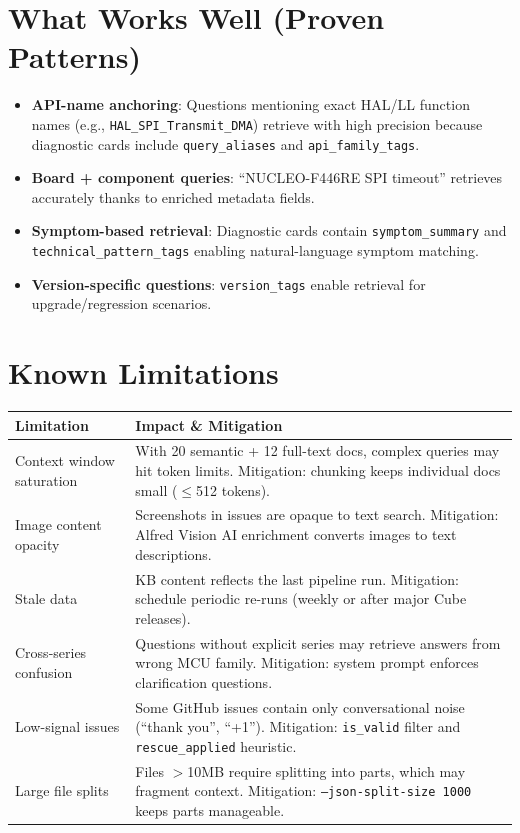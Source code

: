 \documentclass[12pt,a4paper]{report}
\begin{document}
\section{What Works Well (Proven Patterns)}

\begin{itemize}
  \item \textbf{API-name anchoring}: Questions mentioning exact HAL/LL function names (e.g., \texttt{HAL\_SPI\_Transmit\_DMA}) retrieve with high precision because diagnostic cards include \texttt{query\_aliases} and \texttt{api\_family\_tags}.
  \item \textbf{Board + component queries}: ``NUCLEO-F446RE SPI timeout'' retrieves accurately thanks to enriched metadata fields.
  \item \textbf{Symptom-based retrieval}: Diagnostic cards contain \texttt{symptom\_summary} and \texttt{technical\_pattern\_tags} enabling natural-language symptom matching.
  \item \textbf{Version-specific questions}: \texttt{version\_tags} enable retrieval for upgrade/regression scenarios.
\end{itemize}

\section{Known Limitations}

\begin{longtable}{p{5cm}p{8cm}}
\toprule
\textbf{Limitation} & \textbf{Impact \& Mitigation} \\
\midrule
Context window saturation & With 20 semantic + 12 full-text docs, complex queries may hit token limits. Mitigation: chunking keeps individual docs small ($\leq$512 tokens). \\
Image content opacity & Screenshots in issues are opaque to text search. Mitigation: Alfred Vision AI enrichment converts images to text descriptions. \\
Stale data & KB content reflects the last pipeline run. Mitigation: schedule periodic re-runs (weekly or after major Cube releases). \\
Cross-series confusion & Questions without explicit series may retrieve answers from wrong MCU family. Mitigation: system prompt enforces clarification questions. \\
Low-signal issues & Some GitHub issues contain only conversational noise (``thank you'', ``+1''). Mitigation: \texttt{is\_valid} filter and \texttt{rescue\_applied} heuristic. \\
Large file splits & Files $>$10MB require splitting into parts, which may fragment context. Mitigation: \texttt{--json-split-size 1000} keeps parts manageable. \\
\bottomrule
\end{longtable}
\end{document}
